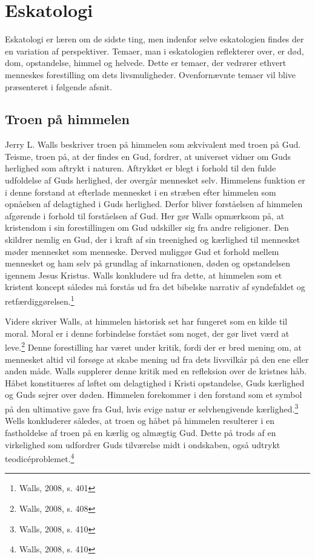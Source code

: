 \chapter{Eskatologi}
\label{chp:esk}
Eskatologi er læren om de sidste ting, men indenfor selve eskatologien findes der en variation af perspektiver. Temaer, man i eskatologien reflekterer over, er død, dom, opstandelse, himmel og helvede. Dette er temaer, der vedrører ethvert menneskes forestilling om dets livsmuligheder. Ovenfornævnte temaer vil blive præsenteret i følgende afsnit.

\section{Troen på himmelen}
Jerry L. Walls beskriver troen på himmelen som ækvivalent med troen på Gud. Teisme, troen på, at der findes en Gud, fordrer, at universet vidner om Guds herlighed som aftrykt i naturen. Aftrykket er blegt i forhold til den fulde udfoldelse af Guds herlighed, der overgår mennesket selv. Himmelens funktion er i denne forstand at efterlade mennesket i en stræben efter himmelen som opnåelsen af delagtighed i Guds herlighed. Derfor bliver forståelsen af himmelen afgørende i forhold til forståelsen af Gud. Her gør Walls opmærksom på, at kristendom i sin forestillingen om Gud udskiller sig fra andre religioner. Den skildrer nemlig en Gud, der i kraft af sin treenighed og kærlighed til mennesket møder mennesket som menneske. Derved muliggør Gud et forhold mellem mennesket og ham selv på grundlag af inkarnationen, døden og opstandelsen igennem Jesus Kristus. Walls konkludere ud fra dette, at himmelen som et kristent koncept således må forstås ud fra det bibelske narrativ af syndefaldet og retfærdiggørelsen.\footnote{Walls, 2008, s. 401}

Videre skriver Walls, at himmelen historisk set har fungeret som en kilde til moral. Moral er i denne forbindelse forstået som noget, der gør livet værd at leve.\footnote{Walls, 2008, s. 408} Denne forestilling har været under kritik, fordi der er bred mening om, at mennesket altid vil forsøge at skabe mening ud fra dets livsvilkår på den ene eller anden måde. Walls supplerer denne kritik med en refleksion over de kristnes håb. Håbet konstitueres af løftet om delagtighed i Kristi opstandelse, Guds kærlighed og Guds sejrer over døden. Himmelen forekommer i den forstand som et symbol på den ultimative gave fra Gud, hvis evige natur er selvhengivende kærlighed.\footnote{Walls, 2008, s. 410} Wells konkluderer således, at troen og håbet på himmelen resulterer i en fastholdelse af troen på en kærlig og almægtig Gud. Dette på trods af en virkelighed som udfordrer Guds tilværelse midt i ondskaben, også udtrykt teodicéproblemet.\footnote{Walls, 2008, s. 410}

